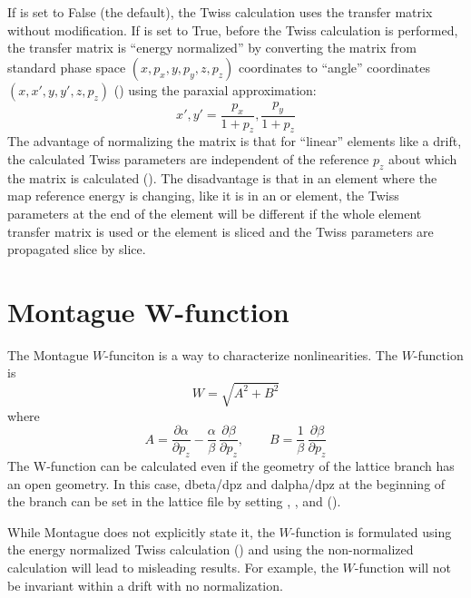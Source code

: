 If  is set to False (the default), the Twiss calculation uses the transfer
matrix without modification. If  is set to True, before the Twiss calculation is
performed, the transfer matrix is ``energy normalized'' by converting the matrix from \bmad standard
phase space $(x, p_x, y, p_y, z, p_z)$ coordinates to ``angle'' coordinates $(x, x', y, y', z, p_z)$
() using the paraxial approximation:
\begin{equation}
  x', y' = \frac{p_x}{1 + p_{z}}, \frac{p_y}{1 + p_z}
\end{equation}
The advantage of normalizing the matrix is that for ``linear'' elements like a drift, the calculated
Twiss parameters are independent of the reference $p_z$ about which the matrix is calculated
(\cite{b:carli}). The disadvantage is that in an element where the map reference energy is changing,
like it is in an  or  element, the Twiss parameters at the end of the element
will be different if the whole element transfer matrix is used or the element is sliced and the
Twiss parameters are propagated slice by slice.

\section{Montague W-function}
\label{s:w.func}

The Montague $W$-funciton\cite{b:montague} is a way to characterize nonlinearities. The $W$-function
is 
\begin{equation}
  W = \sqrt{A^2 + B^2}
\end{equation}
where
\begin{equation}
  A = \frac{\partial\alpha}{\partial p_z} - \frac{\alpha}{\beta} \, \frac{\partial\beta}{\partial p_z},
  \qquad
  B = \frac{1}{\beta} \, \frac{\partial\beta}{\partial p_z}
\end{equation}
The W-function can be calculated even if the geometry of the lattice branch has
an open geometry.  In this case, dbeta/dpz and dalpha/dpz at the beginning of the branch can be set
in the lattice file by setting , ,
 and  ().

While Montague does not explicitly state it, the $W$-function is formulated using the energy
normalized Twiss calculation () and using the non-normalized calculation will lead
to misleading results. For example, the $W$-function will not be invariant within a drift with no
normalization.
